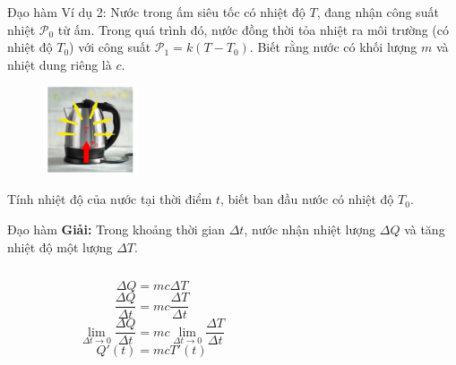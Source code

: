 \begin{frame}{Đạo hàm}
Ví dụ 2: Nước trong ấm siêu tốc có nhiệt độ \(T\), đang nhận công suất nhiệt \(\mathcal{P}_0\) từ ấm. Trong quá trình đó, nước đồng thời tỏa nhiệt ra môi trường (có nhiệt độ \(T_0\)) với công suất \(\mathcal{P}_1=k(T-T_0)\). Biết rằng nước có khối lượng \(m\) và nhiệt dung riêng là \(c\).
\begin{figure}
    \centering
    \includegraphics[width=0.25\textwidth]{Slides/figure/dunnuoc.png}
\end{figure}
Tính nhiệt độ của nước tại thời điểm \(t\), biết ban đầu nước có nhiệt độ \(T_0\).
\end{frame}
\begin{frame}{Đạo hàm}
\textbf{Giải:} Trong khoảng thời gian \(\Delta t\), nước nhận nhiệt lượng \(\Delta Q\) và tăng nhiệt độ một lượng \(\Delta T\).
\begin{columns}
    \begin{column}{0.5\textwidth}
\begin{equation}
\Delta Q=mc\Delta T
\end{equation}
\begin{equation}
\dfrac{\Delta Q}{\Delta t}=mc\dfrac{\Delta T}{\Delta t}
\end{equation}
\begin{equation}
\lim_{\Delta t\to 0}\dfrac{\Delta Q}{\Delta t}=mc\lim_{\Delta t\to 0}\dfrac{\Delta T}{\Delta t}
\end{equation}
\begin{equation}
    Q'(t)=mcT'(t)
\end{equation}
    \end{column}
    \begin{column}{0.5\textwidth}
    \end{column}
    \end{columns}
\end{frame}

